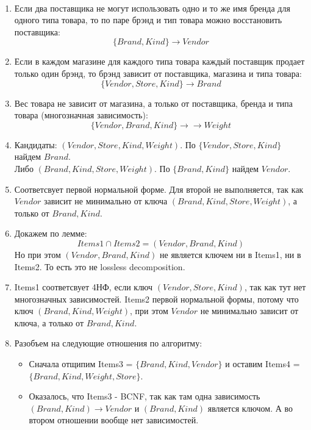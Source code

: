 \begin{solution} \
    \begin{enumerate}[label=\Alph*)]
        \item Если два поставщика не могут использовать одно и то же имя бренда для одного типа товара, то по паре брэнд и тип товара можно восстановить поставщика:
        \[
            \{ Brand, Kind \} \to Vendor
        \]
        \item Если в каждом магазине для каждого типа товара каждый поставщик продает только один брэнд, то брэнд зависит от поставщика, магазина и типа товара:
        \[
            \{ Vendor, Store, Kind \} \to Brand
        \]
        \item Вес товара не зависит от магазина, а только от поставщика, бренда и типа товара (многозначная зависимость):
        \[
            \{ Vendor, Brand, Kind \} \to \to Weight
        \]
        \item Кандидаты: \((Vendor, Store, Kind, Weight)\). По \( \{ Vendor, Store, Kind \} \) найдем \( Brand\). \\
        Либо \( (Brand, Kind, Store, Weight) \). По \( \{ Brand, Kind \} \) найдем \( Vendor \). 
        \item Соответсвует первой нормальной форме. Для второй не выполняется, так как \( Vendor \) зависит не минимально от ключа \( (Brand, Kind, Store, Weight) \), а только от \( Brand, Kind \).
        \item Докажем по лемме:
        \[
            Items1 \cap Items2 = (Vendor, Brand, Kind)
        \]
        Но при этом $(Vendor, Brand, Kind)$ не является ключем ни в Items1, ни в Items2. То есть это не lossless decomposition.
        \item Items1 соответсвует 4НФ, если ключ \( (Vendor, Store, Kind) \), так как тут нет многозначных зависимостей. Items2 первой нормальной формы, потому что ключ \( (Brand, Kind, Weight) \), при этом \(Vendor\) не минимально зависит от ключа, а только от \(Brand, Kind\).
        \item Разобъем на следующие отношения по алгоритму:
        \begin{itemize}
            \item Сначала отщипим Items3 = \( \{ Brand, Kind, Vendor \} \) и оставим Items4 = \( \{ Brand, Kind, Weight, Store \} \).
            \item Оказалось, что Items3 - BCNF, так как там одна зависимость \( (Brand, Kind) \to Vendor \) и \( (Brand, Kind) \) является ключом. А во втором отношении вообще нет зависимостей.

\end{itemize}
\end{enumerate}
\end{solution}
